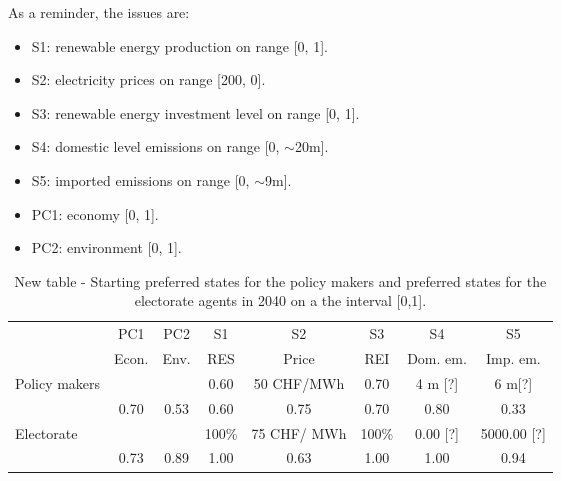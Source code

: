 \documentclass[12pt]{article}
\begin{document}
As a reminder, the issues are: 

\begin{itemize}
\item S1: renewable energy production on range [0, 1].
\item S2: electricity prices on range [200, 0]. %
\item S3: renewable energy investment level on range [0, 1].
\item S4: domestic level emissions on range [0, $\sim$20m].
\item S5: imported emissions on range [0, $\sim$9m]. %
\item PC1: economy [0, 1]. %
\item PC2: environment [0, 1]. %
\end{itemize}

\begin{table}
\begin{center}
\begin{tabular}{|l|c|c|c|c|c|c|c|} 
\hline
		& PC1		& PC2	&  S1	& S2			& S3		& S4			& S5			\\ 
		& Econ.		& Env.	& RES	& Price		& REI	& Dom. em.	& Imp. em.	\\ \hline
\multirow{2}{*}{Policy makers}
		& 			&		& 0.60	& 50 CHF/MWh	& 0.70	& 4 m [?]		& 6 m[?]		\\ \cline{2-8}
		& 0.70		& 0.53	& 0.60	& 0.75		& 0.70	& 0.80		& 0.33		\\ \hline
\multirow{2}{*}{Electorate}
		&			&		&100\%	& 75 CHF/	MWh	& 100\%	& 0.00 [?]		& 5000.00	 [?]	\\ \cline{2-8}
		& 0.73		& 0.89	&1.00	& 0.63		& 1.00	& 1.00		& 0.94	 	\\ \hline
\end{tabular}
\end{center}
\caption{New table - Starting preferred states for the policy makers and preferred states for the electorate agents in 2040 on a the interval [0,1].}
\label{tab:}
\end{table}

\end{document}
